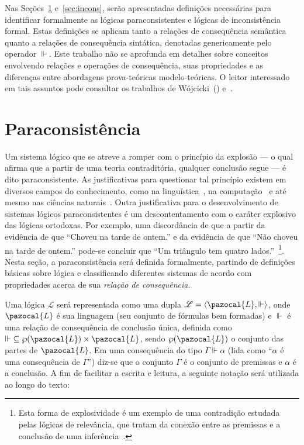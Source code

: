 Nas Seções~\ref{sec:paracons} e~\ref{sec:incons}, serão apresentadas definições necessárias para identificar formalmente as lógicas paraconsistentes e lógicas de inconsistência formal. Estas definições se aplicam tanto a relações de consequência semântica quanto a relações de consequência sintática, denotadas genericamente pelo operador $\Vdash$. Este trabalho não se aprofunda em detalhes sobre conceitos envolvendo relações e operações de consequência, suas propriedades e as diferenças entre abordagens prova-teóricas modelo-teóricas. O leitor interessado em tais assuntos pode consultar os trabalhos de Wójcicki~(\citeyear{Wojcicki1984-WJCLOP,Wojcicki1988-WOJAAT,Wojcicki1988-WOJTOL}) e~.

\section{Paraconsistência}\label{sec:paracons}
    Um sistema lógico que se atreve a romper com o princípio da explosão {---} o qual afirma que a partir de uma teoria contraditória, qualquer conclusão segue {---} é dito paraconsistente. As justificativas para questionar tal princípio existem em diversos campos do conhecimento, como na linguística~\cite{McGinnis2013-MCGTUA}, na computação~\cite{carnielli2000formal} e até mesmo nas ciências naturais~\cite{Brown2015-BROCAP-9}. Outra justificativa para o desenvolvimento de sistemas lógicos paraconsistentes é um descontentamento com o caráter explosivo das lógicas ortodoxas. Por exemplo, uma discordância de que a partir da evidência de que ``Choveu na tarde de ontem.'' e da evidência de que ``Não choveu na tarde de ontem.'' pode-se concluir que ``Um triângulo tem quatro lados.''~\footnote{Esta forma de explosividade é um exemplo de uma contradição estudada pelas lógicas de relevância, que tratam da conexão entre as premissas e a conclusão de uma inferência~\cite{sep-logic-relevance}.}. Nesta seção, a paraconsistência será definida formalmente, partindo de definições básicas sobre lógica e classificando diferentes sistemas de acordo com propriedades acerca de sua \textit{relação de consequência}.

    Uma lógica $\mathcal{L}$ será representada como uma dupla $\mathcal{L} = \langle \pazocal{L},\Vdash \rangle$, onde $\pazocal{L}$ é sua linguagem (seu conjunto de fórmulas bem formadas) e $\Vdash$ é uma relação de consequência de conclusão única, definida como $\Vdash \;\subseteq \wp(\pazocal{L})\times\pazocal{L}$, sendo $\wp(\pazocal{L})$ o conjunto das partes de $\pazocal{L}$. Em uma consequência do tipo $\Gamma \Vdash \alpha$ (lida como ``$\alpha$ é uma consequência de $\Gamma$'') diz-se que o conjunto $\Gamma$ é o conjunto de premissas e $\alpha$ é a conclusão. A fim de facilitar a escrita e leitura, a seguinte notação será utilizada ao longo do texto:

